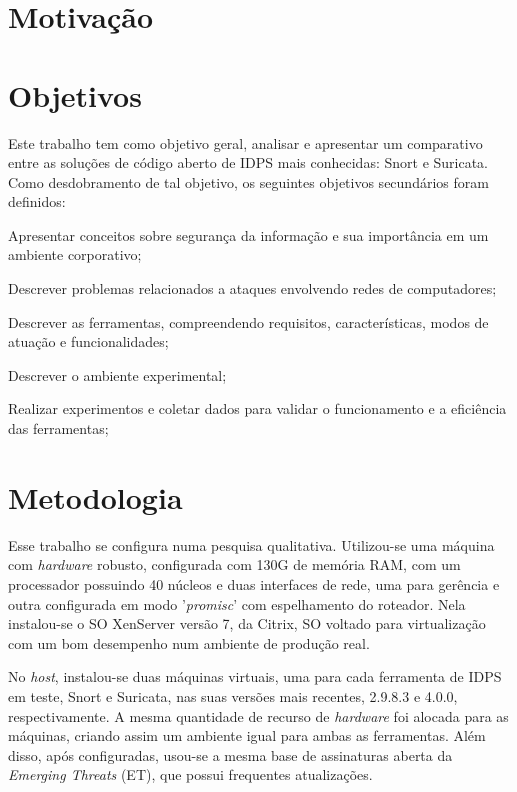 \section{Motivação} \label{sec:motivação} 

\section{Objetivos} \label{sec:objetivos}

Este trabalho tem como objetivo geral, analisar e apresentar um comparativo entre as soluções de código aberto de IDPS mais conhecidas: Snort e Suricata. Como desdobramento de tal objetivo, os seguintes objetivos secundários foram definidos:

\begin{alineas}
\item Apresentar conceitos sobre segurança da informação e sua importância em um ambiente corporativo;
\item Descrever problemas relacionados a ataques envolvendo redes de computadores;
\item Descrever as ferramentas, compreendendo requisitos, características, modos de atuação e funcionalidades;
\item Descrever o ambiente experimental;
\item Realizar experimentos e coletar dados para validar o funcionamento e a eficiência das ferramentas;
\end{alineas}

\section{Metodologia} \label{sec:metodologia}

Esse trabalho se configura numa pesquisa qualitativa. Utilizou-se uma máquina com \textit{hardware} robusto, configurada com 130G de memória RAM, com um processador possuindo 40 núcleos e duas interfaces de rede, uma para gerência e outra configurada em modo '\textit{promisc}' com espelhamento do roteador. Nela instalou-se o SO XenServer versão 7, da Citrix, SO voltado para virtualização com um bom desempenho num ambiente de produção real. 

No \textit{host}, instalou-se duas máquinas virtuais, uma para cada ferramenta de IDPS em teste, Snort e Suricata, nas suas versões mais recentes, 2.9.8.3 e 4.0.0, respectivamente. A mesma quantidade de recurso de \textit{hardware} foi alocada para as máquinas, criando assim um ambiente igual para ambas as ferramentas. Além disso, após configuradas, usou-se a mesma base de assinaturas aberta da \textit{Emerging Threats} (ET), que possui frequentes atualizações.


